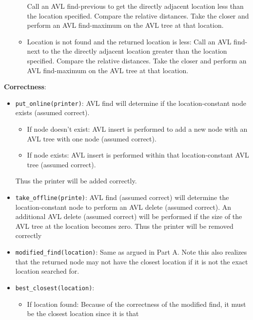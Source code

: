 \documentclass[12pt,twoside]{article}
\begin{document}
\begin{problems}
\begin{problemparts}
\begin{itemize}
\begin{itemize}
            Call an AVL find-previous to get the directly adjacent location
            less than the location specified. Compare the relative distances.
            Take the closer and perform an AVL find-maximum on the AVL tree
            at that location.
            \item Location is not found and the returned location is less:
            Call an AVL find-next to the the directly adjacent location
            greater than the location specified. Compare the relative
            distances. Take the closer and perform an AVL find-maximum on the
            AVL tree at that location.
        \end{itemize}
    \end{itemize}

    \smallbreak

    {\bf Correctness}: \begin{itemize}
        \item {\tt put\_online(printer)}: AVL find will determine if the
        location-constant node exists (assumed correct).
        \begin{itemize}
            \item If node doesn't exist: AVL insert is performed to add a new
            node with an AVL tree with one node (assumed correct).
            \item If node exists: AVL insert is performed within that
            location-constant AVL tree (assumed correct).
        \end{itemize}
        Thus the printer will be added correctly.
        \item {\tt take\_offline(printe)}: AVL find (assumed correct) will
        determine the location-constant node to perform an AVL delete
        (assumed correct). An additional AVL delete (assumed correct) will be
        performed if the size of the AVL tree at the location becomes zero.
        Thus the printer will be removed correctly
        \item {\tt modified\_find(location)}: Same as argued in Part A. Note
        this also realizes that the returned node may not have the closest
        location if it is not the exact location searched for.
        \item {\tt best\_closest(location)}: \begin{itemize}
            \item If location found: Because of the correctness of the
            modified find, it must be the closest location since it is that

\end{itemize}
\end{itemize}
\end{problemparts}
\end{problems}
\end{document}
